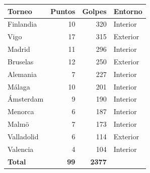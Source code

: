 \begin{tabular}{lrrl}
\toprule
\textbf{Torneo} & \textbf{Puntos} & \textbf{Golpes} & \textbf{Entorno} \\
\midrule
Finlandia & 10 & 320 & Interior \\
Vigo & 17 & 315 & Exterior \\
Madrid & 11 & 296 & Interior \\
Bruselas & 12 & 250 & Exterior \\
Alemania & 7 & 227 & Interior \\
Málaga & 10 & 201 & Interior \\
Ámsterdam & 9 & 190 & Interior \\
Menorca & 6 & 187 & Interior \\
Malmö & 7 & 173 & Interior \\
Valladolid & 6 & 114 & Exterior \\
Valencia & 4 & 104 & Interior \\
\midrule
\textbf{Total} & \textbf{99} & \textbf{2377} &  \\
\bottomrule
\end{tabular}
